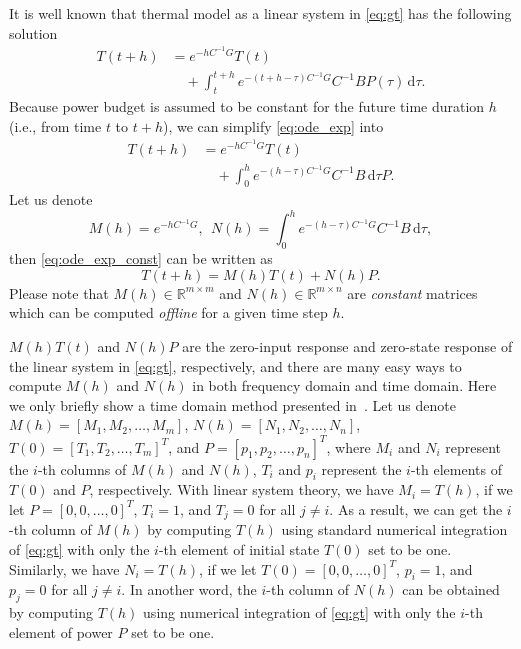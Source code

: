 It is well known that thermal model as a linear system in \eqref{eq:gt} has the following solution
\begin{equation}\label{eq:ode_exp}
\begin{split}
T(t+h) &= e^{-hC^{-1}G}T(t)\\
& \quad +\int_{t}^{t+h} \! e^{-(t+h-\tau)C^{-1}G}C^{-1}BP(\tau) \, \mathrm{d}\tau.
\end{split}
\end{equation}
Because power budget is assumed to be constant for the future time
duration $h$ (i.e., from time $t$ to $t+h$), we can simplify
\eqref{eq:ode_exp} into
\begin{equation}\label{eq:ode_exp_const}
\begin{split}
T(t+h) &= e^{-hC^{-1}G}T(t)\\
& \quad +\int_{0}^{h} \! e^{-(h-\tau)C^{-1}G}C^{-1}B \, \mathrm{d}\tau P.
\end{split}
\end{equation}
Let us denote 
\begin{equation*}
M(h)=e^{-hC^{-1}G}, ~~N(h)=\int_{0}^{h} \! e^{-(h-\tau)C^{-1}G}C^{-1}B \, \mathrm{d}\tau,
\end{equation*}
then \eqref{eq:ode_exp_const} can be written as
\begin{equation}\label{eq:ode_exp_h}
T(t+h) =M(h)T(t)+N(h)P.
\end{equation}
Please note that $M(h) \in \mathbb{R}^{m\times m}$ and $N(h) \in
\mathbb{R}^{m \times n}$ are \emph{constant} matrices which
can be computed \emph{offline} for a given time step $h$. 

$M(h)T(t)$ and $N(h)P$ are the zero-input response and zero-state response of the
linear system in \eqref{eq:gt}, respectively, and there are many
easy ways to compute $M(h)$ and $N(h)$ in both frequency domain and
time domain. Here we only briefly show a time domain method presented
in~\cite{Han:JLPE'07}. 
Let us denote $M(h)=[M_1, M_2, \ldots, M_m]$, $N(h)=[N_1, N_2, \ldots, N_n]$,
$T(0)=[T_1, T_2, \ldots, T_m]^T$, and $P=[p_1, p_2, \ldots, p_n]^T$,
where $M_i$ and $N_i$ represent the $i$-th columns of $M(h)$ and $N(h)$,
$T_i$ and $p_i$ represent the $i$-th elements of $T(0)$ and $P$,
respectively. With linear system theory, we have $M_i=T(h)$, if we let $P=[0,0,\ldots,0]^{T}$, $T_i=1$, and
$T_j=0$ for all $j\neq i$. As a result, we can get the $i$-th column of
$M(h)$ by computing $T(h)$ using standard numerical integration of \eqref{eq:gt} with only the $i$-th
element of initial state $T(0)$ set to be one. Similarly, we have
$N_i=T(h)$, if we let $T(0)=[0,0,\ldots,0]^T$, $p_i=1$, and $p_j=0$ for all $j\neq
i$. In another word, the $i$-th column of
$N(h)$ can be obtained by computing $T(h)$ using numerical integration of
\eqref{eq:gt} with only the $i$-th
element of power $P$ set to be one.


